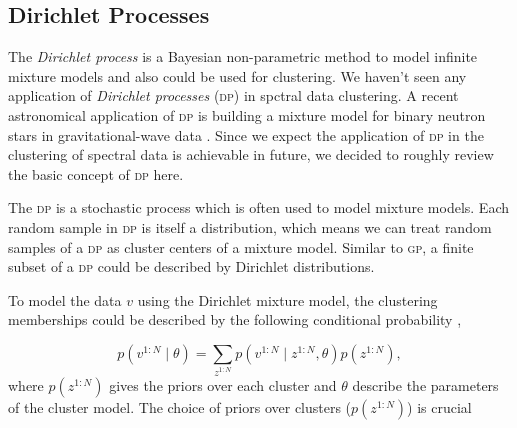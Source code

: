 \documentclass{ar-1col}
\begin{document}
\subsection{Dirichlet Processes}

The \textit{Dirichlet process} \citep{Teh2006} is a Bayesian non-parametric method to model infinite mixture models and also could be used for clustering. We haven't seen any application of \textit{Dirichlet processes} (\textsc{dp}) in spctral data clustering. 
A recent astronomical application of \textsc{dp} is building a mixture model for binary neutron stars in gravitational-wave data \citep{Pozzo2018}. 
Since we expect the application of \textsc{dp} in the clustering of spectral data is achievable in future, we decided to roughly review the basic concept of \textsc{dp} here.

The \textsc{dp} is a stochastic process which is often used to model mixture models. 
Each random sample in \textsc{dp} is itself a distribution, which means we can treat random samples of a \textsc{dp} as cluster centers of a mixture model. 
Similar to \textsc{gp}, a finite subset of a \textsc{dp} could be described by Dirichlet distributions.

To model the data $v$ using the Dirichlet mixture model,
the clustering memberships could be described by the following conditional probability \citep{Barber2012}, 

\begin{equation}
    p(v^{1:N} \mid \theta) = \sum_{z^{1:N}} p(v^{1:N} \mid z^{1:N}, \theta) p(z^{1:N}),
    \label{eq:indicator}
\end{equation}
where $p(z^{1:N})$ gives the priors over each cluster and $\theta$ describe the parameters of the cluster model. 
The choice of priors over clusters ($p(z^{1:N})$) is crucial
\end{document}
